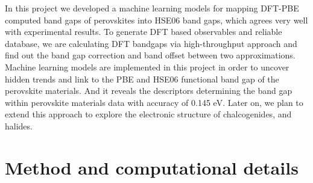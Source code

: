 \documentclass[%
reprint,
superscriptaddress,
citeautoscript,
 amsmath,amssymb,
 aps,
 prl,
floatfix,
]{revtex4-1}
\begin{document}
In this project we developed a machine learning models for mapping DFT-PBE computed band gaps of perovskites into HSE06 band gaps, which agrees very well with experimental results. To generate DFT based observables and reliable database, we are calculating DFT bandgaps via high-throughput approach and find out the band gap correction and band offset between two approximations. 
Machine learning models are implemented in this project in order to uncover hidden trends and link to the PBE and HSE06 functional band gap of the perovskite materials. And it reveals the descriptors determining the band gap within perovskite materials data with accuracy of 0.145 eV. Later on, we plan to extend this approach to explore the electronic structure of chalcogenides, and halides. 






\section{Method and computational details}
\end{document}
